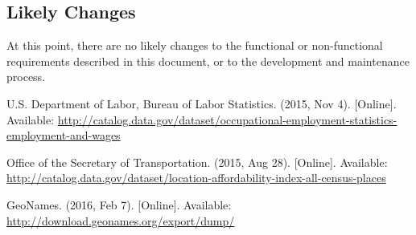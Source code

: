 \documentclass[english]{article}
\begin{document}
\subsection{Likely Changes}
At this point, there are no likely changes to the functional or non-functional requirements described in this document, or to the development and maintenance process.


\newpage
\begin{thebibliography}{99} %

U.S. Department of Labor, Bureau of Labor Statistics.
\newblock (2015, Nov 4).
 [Online].
\newblock Available: \url{http://catalog.data.gov/dataset/occupational-employment-statistics-employment-and-wages}

Office of the Secretary of Transportation.
\newblock (2015, Aug 28).
 [Online].
\newblock Available: \url{http://catalog.data.gov/dataset/location-affordability-index-all-census-places}

GeoNames.
\newblock (2016, Feb 7).
 [Online].
\newblock Available: \url{http://download.geonames.org/export/dump/}

\end{thebibliography}
\end{document}
